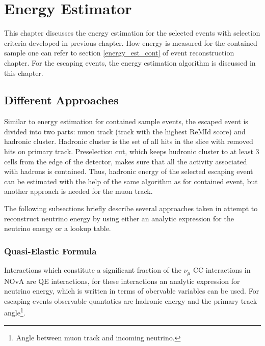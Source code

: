 \chapter{Energy Estimator}
\label{energy_estimator_chapter}

This chapter discusses the energy estimation for the selected events with selection
criteria developed in previous chapter. How energy is measured for the contained 
sample one can refer to section \ref{energy_est_cont} of event reconstruction chapter.
For the escaping events, the energy estimation algorithm is discussed in this chapter.

\section{Different Approaches}
Similar to energy estimation for contained sample events, the escaped event is divided
into two parts: muon track (track with the highest ReMId score) and hadronic cluster.
Hadronic cluster is the set of all hits in the slice with removed hits on primary 
track. Preselection cut, which keeps hudronic cluster to at least 3 cells from
the edge of the detector, makes sure that all the activity associated with hadrons is
contained. Thus, hadronic energy of the selected escaping event can be estimated
with the help of the same algorithm as for contained event, but another approach is needed
for the muon track.

The following subsections briefly describe several approaches taken in attempt to reconstruct
neutrino energy by using either an analytic expression for the neutrino energy or a 
lookup table.

\subsection{Quasi-Elastic Formula}
Interactions which constitute a significant fraction of the $\nu_\mu$ CC interactions 
in NOvA are QE interactions, for these interactions an analytic expression for
neutrino energy, which is written in terms of obervable variables can be used. For escaping events
observable quantaties are hadronic energy and the primary track angle\footnote{Angle
between muon track and incoming neutrino.}. 

